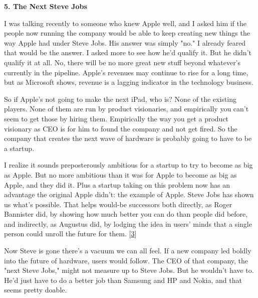 \textbf{5. The Next Steve Jobs}

I was talking recently to someone who knew Apple
                  well, and I asked him if the people now running the company
                  would be able to keep creating new things the way Apple had
                  under Steve Jobs. His answer was simply "no." I already feared
                  that would be the answer. I asked more to see how he'd qualify
                  it. But he didn't qualify it at all. No, there will be no more
                  great new stuff beyond whatever's currently in the pipeline.
                  Apple's revenues may continue to rise for a long time, but as
                  Microsoft shows, revenue is a lagging indicator in the
                  technology business.

So if Apple's not going to
                  make the next iPad, who is? None of the existing players. None
                  of them are run by product visionaries, and empirically you
                  can't seem to get those by hiring them. Empirically the way
                  you get a product visionary as CEO is for him to found the
                  company and not get fired. So the company that creates the
                  next wave of hardware is probably going to have to be a
                  startup.

I realize it sounds preposterously
                  ambitious for a startup to try to become as big as Apple. But
                  no more ambitious than it was for Apple to become as big as
                  Apple, and they did it. Plus a startup taking on this problem
                  now has an advantage the original Apple didn't: the example of
                  Apple. Steve Jobs has shown us what's possible. That helps
                  would-be successors both directly, as Roger Bannister did, by
                  showing how much better you can do than people did before, and
                  indirectly, as Augustus did, by lodging the idea in users'
                  minds that a single person could unroll the future for them.
                  [\href{\#f3n}{3}]

Now Steve is gone there's a vacuum we can all
                  feel. If a new company led boldly into the future of hardware,
                  users would follow. The CEO of that company, the "next Steve
                  Jobs," might not measure up to Steve Jobs. But he wouldn't
                  have to. He'd just have to do a better job than Samsung and HP
                  and Nokia, and that seems pretty doable.

